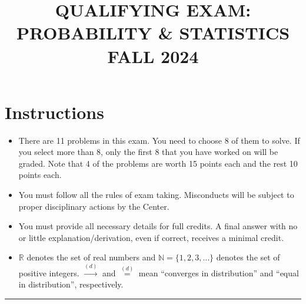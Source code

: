 \documentclass[11pt,a4paper]{article}
\title{\textbf{QUALIFYING EXAM: PROBABILITY \& STATISTICS}\\[0.5em]\Large FALL 2024}
\date{}
\author{}
\begin{document}
\maketitle
\vspace{-3em}

\section*{Instructions}
\begin{itemize}
    \item There are 11 problems in this exam. You need to choose 8 of them to solve. If you select more than 8, only the first 8 that you have worked on will be graded. Note that 4 of the problems are worth 15 points each and the rest 10 points each.
    \item You must follow all the rules of exam taking. Misconducts will be subject to proper disciplinary actions by the Center.
    \item You must provide all necessary details for full credits. A final answer with no or little explanation/derivation, even if correct, receives a minimal credit.
    \item $\mathbb{R}$ denotes the set of real numbers and $\mathbb{N} = \{1, 2, 3, \dots\}$ denotes the set of positive integers. $\xrightarrow{(d)}$ and $\stackrel{(d)}{=}$ mean ``converges in distribution'' and ``equal in distribution'', respectively.
\end{itemize}

\noindent\rule{\linewidth}{0.4pt}
\end{document}
